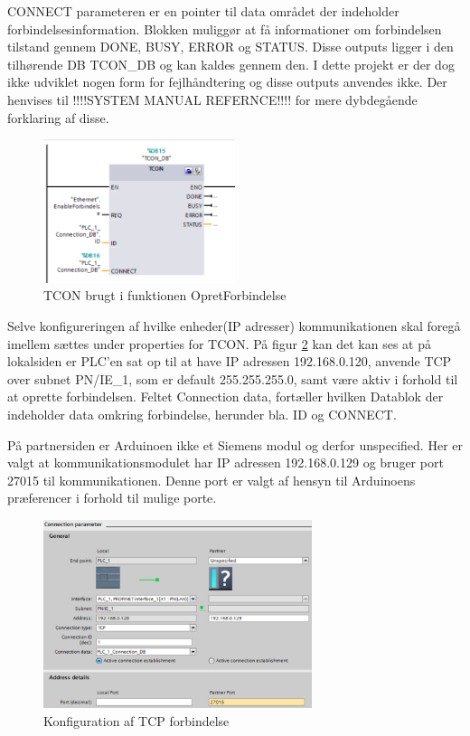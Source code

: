 CONNECT parameteren er en pointer til data området der indeholder forbindelsesinformation. Blokken muliggør at få informationer om forbindelsen tilstand gennem DONE, BUSY, ERROR og STATUS. Disse outputs ligger i den tilhørende DB TCON\_DB og kan kaldes gennem den. I dette projekt er der dog ikke udviklet nogen form for fejlhåndtering og disse outputs anvendes ikke. Der henvises til !!!!SYSTEM MANUAL REFERNCE!!!! for mere dybdegående forklaring af disse.

\begin{figure}[H] %
	\centering
	\includegraphics[width=0.5\textwidth]{Figure/TCON}
	\caption{TCON brugt i funktionen OpretForbindelse}
	\label{fig:TCON}
\end{figure}

Selve konfigureringen af hvilke enheder(IP adresser) kommunikationen skal foregå imellem sættes under properties for TCON. På figur \ref{fig:Konfiguration} kan det kan ses at på lokalsiden er PLC'en sat op til at have IP adressen 192.168.0.120, anvende TCP over subnet PN/IE\_1, som er default 255.255.255.0, samt være aktiv i forhold til at oprette forbindelsen. Feltet Connection data, fortæller hvilken Datablok der indeholder data omkring forbindelse, herunder bla. ID og CONNECT.

På partnersiden er Arduinoen ikke et Siemens modul og derfor unspecified. Her er valgt at kommunikationsmodulet har IP adressen 192.168.0.129 og bruger port 27015 til kommunikationen. Denne port er valgt af hensyn til Arduinoens præferencer i forhold til mulige porte.

\begin{figure}[H] %
	\centering
	\includegraphics[width=0.7\textwidth]{Figure/KonfigurationAfTCPforbindelse}
	\caption{Konfiguration af TCP forbindelse}
	\label{fig:Konfiguration}
\end{figure}

